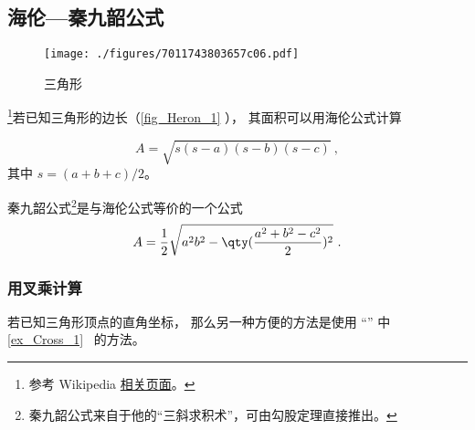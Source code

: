 

\subsection{海伦—秦九韶公式}
\begin{figure}[ht]
\centering
\texttt{[image: ./figures/7011743803657c06.pdf]}
\caption{三角形} \label{fig_Heron_1}
\end{figure}
\footnote{参考 Wikipedia \href{https://en.wikipedia.org/wiki/Heron's_formula}{相关页面}。}若已知三角形的边长（\autoref{fig_Heron_1} ）， 其面积可以用海伦公式计算

\begin{equation}\label{eq_Heron_1}
A = \sqrt{s(s-a)(s-b)(s-c)}~,
\end{equation}
其中 $s = (a+b+c)/2$。

秦九韶公式\footnote{秦九韶公式来自于他的“三斜求积术”，可由勾股定理直接推出。}是与海伦公式等价的一个公式
\begin{equation}
A = \frac{1}{2}\sqrt{a^2b^2-\qty(\frac{a^2+b^2-c^2}{2})^2}~.
\end{equation}

\subsubsection{用叉乘计算}
若已知三角形顶点的直角坐标， 那么另一种方便的方法是使用 “” 中\autoref{ex_Cross_1}~ 的方法。

